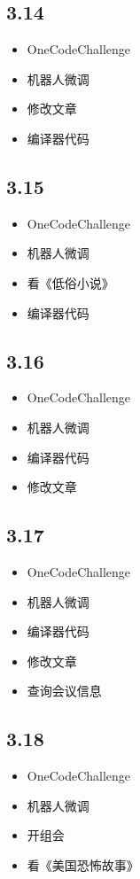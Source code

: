 \documentclass[UTF8]{ctexart}
\begin{document}
\subsection*{3.14}
\begin{itemize}
    \item OneCodeChallenge
    \item 机器人微调
    \item 修改文章
    \item 编译器代码
\end{itemize}

\subsection*{3.15}
\begin{itemize}
    \item OneCodeChallenge
    \item 机器人微调
    \item 看《低俗小说》
    \item 编译器代码
\end{itemize}

\subsection*{3.16}
\begin{itemize}
    \item OneCodeChallenge
    \item 机器人微调
    \item 编译器代码
    \item 修改文章
\end{itemize}

\subsection*{3.17}
\begin{itemize}
    \item OneCodeChallenge
    \item 机器人微调
    \item 编译器代码
    \item 修改文章
    \item 查询会议信息
\end{itemize}

\subsection*{3.18}
\begin{itemize}
    \item OneCodeChallenge
    \item 机器人微调
    \item 开组会
    \item 看《美国恐怖故事》
\end{itemize}
\end{document}
